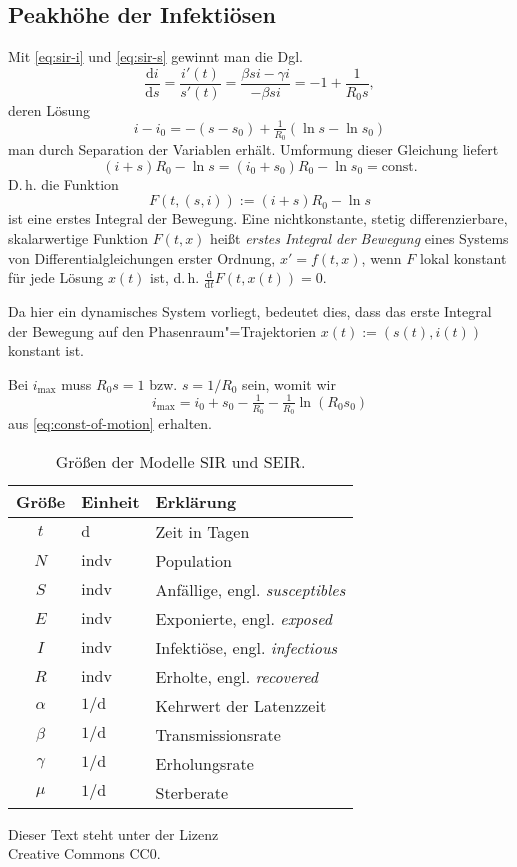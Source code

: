 \documentclass[a4paper,10pt,fleqn,twocolumn,dvipdfmx]{scrartcl}
\numberwithin{equation}{section}
\newcommand{\unit}[1]{\mathrm{#1}}
\newcommand{\strong}[1]{{\sffamily\bfseries #1}}
\begin{document}
\subsection{Peakhöhe der Infektiösen}

Mit \eqref{eq:sir-i} und \eqref{eq:sir-s} gewinnt man die Dgl.%
\begin{equation}
\frac{\mathrm di}{\mathrm ds} = \frac{i'(t)}{s'(t)}
= \frac{\beta si - \gamma i}{-\beta si} = -1 + \frac{1}{R_0 s},
\end{equation}
deren Lösung
\begin{equation}
i-i_0 = - (s-s_0) + \tfrac{1}{R_0}(\ln s - \ln s_0)
\end{equation}
man durch Separation der Variablen erhält. Umformung dieser
Gleichung liefert%
\begin{equation}\label{eq:const-of-motion}
(i+s)R_0-\ln s = (i_0+s_0)R_0-\ln s_0 = \mathrm{const}.
\end{equation}
D.\,h. die Funktion
\begin{equation}
F(t,(s,i)) := (i+s)R_0 - \ln s
\end{equation}
ist eine erstes Integral der Bewegung. Eine nichtkonstante, stetig
differenzierbare, skalarwertige Funktion $F(t,x)$
heißt \emph{erstes Integral der Bewegung} eines Systems
von Differentialgleichungen erster Ordnung, $x'=f(t,x)$,
wenn $F$ lokal konstant für jede Lösung $x(t)$ ist, d.\,h.
$\tfrac{\mathrm d}{\mathrm dt}F(t,x(t))=0$.

Da hier ein dynamisches System vorliegt, bedeutet dies, dass
das erste Integral der Bewegung auf den
Phasenraum"=Trajektorien $x(t):=(s(t),i(t))$ konstant ist.

Bei $i_\mathrm{max}$ muss $R_0 s = 1$ bzw. $s = 1/R_0$ sein, womit wir
\begin{equation}
i_\mathrm{max} = i_0 + s_0 - \tfrac{1}{R_0} - \tfrac{1}{R_0}\ln(R_0 s_0)
\end{equation}
aus \eqref{eq:const-of-motion} erhalten.

\begin{table}
\begin{tabular}{cll}
\toprule
\strong{Größe} & \strong{Einheit} & \strong{Erklärung}\\
\midrule
$t$ & $\unit{d}$ & Zeit in Tagen\\
$N$ & $\unit{indv}$ & Population\\
$S$ & $\unit{indv}$ & Anfällige, engl. \emph{susceptibles}\\
$E$ & $\unit{indv}$ & Exponierte, engl. \emph{exposed}\\
$I$ & $\unit{indv}$ & Infektiöse, engl. \emph{infectious}\\
$R$ & $\unit{indv}$ & Erholte, engl. \emph{recovered}\\
$\alpha$ & $1/\unit d$ & Kehrwert der Latenzzeit\\
$\beta$ & $1/\unit d$ & Transmissionsrate\\
$\gamma$ & $1/\unit d$ & Erholungsrate\\
$\mu$ & $1/\unit d$ & Sterberate\\
\bottomrule
\end{tabular}
\caption{Größen der Modelle SIR und SEIR.}
\end{table}

\mbox{}
\vfill

\noindent
{\small Dieser Text steht unter der Lizenz\\
Creative Commons CC0.}
\end{document}
